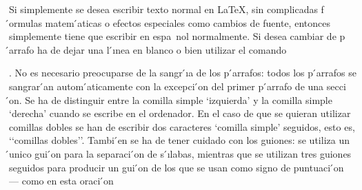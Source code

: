 \documentclass[a4paper,10pt]{letter}
\begin{document}
Si simplemente se desea escribir texto normal en LaTeX,
sin complicadas f ́ormulas matem ́aticas o efectos especiales
como cambios de fuente, entonces simplemente tiene que escribir
en espa~nol normalmente.
Si desea cambiar de p ́arrafo ha de dejar una l ́ınea en blanco o bien
utilizar el comando \par.
No es necesario preocuparse de la sangr ́ıa de los p ́arrafos:
todos los p ́arrafos se sangrar ́an autom ́aticamente con la excepci ́on
del primer p ́arrafo de una secci ́on.
Se ha de distinguir entre la comilla simple ‘izquierda’
y la comilla simple ‘derecha’ cuando se escribe en el ordenador.
En el caso de que se quieran utilizar comillas dobles se han de
escribir dos caracteres ‘comilla simple’ seguidos, esto es,
‘‘comillas dobles’’.
Tambi ́en se ha de tener cuidado con los guiones: se utiliza un ́unico
gui ́on para la separaci ́on de s ́ılabas, mientras que se utilizan
tres guiones seguidos para producir un gui ́on de los que se usan
como signo de puntuaci ́on --- como en esta oraci ́on
\end{document}
